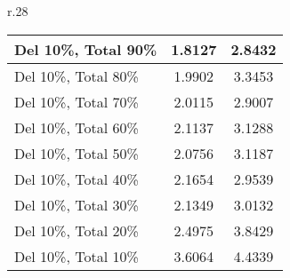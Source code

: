 \begin{wraptable}[19]{r}{.28\textwidth}
{\begin{tabular}{l|cc}
Del 10\%, Total 90\%  & 1.8127                                                    & 2.8432                                            \\\midrule
Del 10\%, Total 80\%  & 1.9902                                                    & 3.3453                                            \\\midrule
Del 10\%, Total 70\%  & 2.0115                                                    & 2.9007                                            \\\midrule
Del 10\%, Total 60\%  & 2.1137                                                    & 3.1288                                            \\\midrule
Del 10\%, Total 50\%  & 2.0756                                                    & 3.1187                                            \\\midrule
Del 10\%, Total 40\%  & 2.1654                                                    & 2.9539                                            \\\midrule
Del 10\%, Total 30\%  & 2.1349                                                    & 3.0132                                            \\\midrule
Del 10\%, Total 20\%  & 2.4975                                                    & 3.8429                                            \\\midrule
Del 10\%, Total 10\%  & 3.6064                                                    & 4.4339   
\\
\midrule
\bottomrule
\end{tabular}%
}
\end{wraptable}